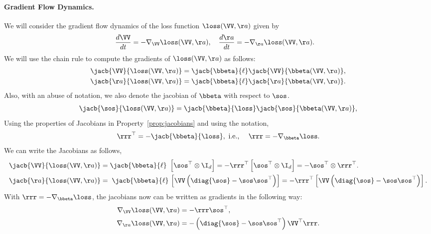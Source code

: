 \documentclass{article}
\theoremstyle{plain}
\theoremstyle{definition}
\theoremstyle{remark}
\begin{document}
\paragraph{Gradient Flow Dynamics.} We will consider the gradient flow dynamics of 
the loss function $\loss(\VV, \aa)$ given by
\begin{align} \label{eq:gradient-flow}
    \frac{d\VV}{dt} &= - \nabla_{\VV} \loss(\VV, \aa),  \quad 
    \frac{d\aa}{dt} = - \nabla_{\aa} \loss(\VV, \aa).
\end{align}
We will use the chain rule to compute the gradients of $\loss(\VV, \aa)$ as follows:
\begin{align*}
\jacb{\VV}{\loss(\VV, \aa)} &= \jacb{\bbeta}{\ell} \jacb{\VV}{\bbeta(\VV, \aa)}, \\ 
\jacb{\aa}{\loss(\VV, \aa)} &= \jacb{\bbeta}{\ell} \jacb{\aa}{\bbeta(\VV, \aa)}.
\end{align*}
Also, with an abuse of notation, we also denote the jacobian of $\bbeta$ with respect to $\sos$.  
\begin{align*}
    \jacb{\sos}{\loss(\VV, \aa)} = \jacb{\bbeta}{\loss} \jacb{\sos}{\bbeta(\VV, \aa)}, \\
\end{align*}
Using the properties of Jacobians in Property~\ref{prop:jacobians} and using the notation, 
\begin{align*}
 \rrr^{\top} = - \jacb{\bbeta}{\loss}, \text{ i.e., } \quad \rrr = - \nabla_{\bbeta} \loss. 
\end{align*}
We can write the Jacobians as follows, 
\begin{align*}
    \jacb{\VV}{\loss(\VV, \aa)} &=  \jacb{\bbeta}{\ell} \, \, \left[ \sos^{\top} \otimes \I_{d} \right] = - \rrr^{\top}  \left[ \sos^{\top} \otimes \I_{d} \right] = - \sos^{\top} \otimes \rrr^{\top}.   \\
    \jacb{\aa}{\loss(\VV, \aa)} &=  \; \jacb{\bbeta}{\ell} \, \left[ \VV \left( \diag{\sos} - \sos \sos^{\top} \right) \right] = - \rrr^{\top} \left[ \VV \left( \diag{\sos} - \sos \sos^{\top} \right) \right]. \\
\end{align*} 
With $\rrr = - \nabla_{\bbeta} \loss$,  the jacobians now can be written as gradients in the following way:
\begin{align} \label{eq:gradients-general-loss}
    \nabla_{\VV} \loss(\VV, \aa) &=  - \rrr \sos^{\top},  \\
    \nabla_{\aa} \loss(\VV, \aa) &=  - \left( \diag{\sos} - \sos \sos^{\top} \right) \VV^{\top} \rrr.
\end{align}
\end{document}
